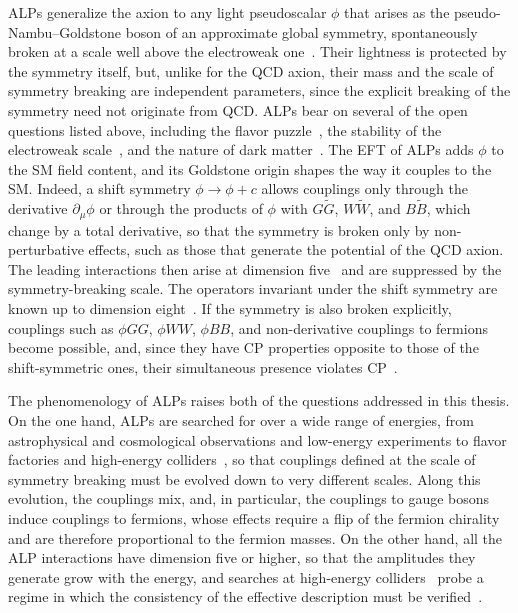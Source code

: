 ALPs generalize the axion to any light pseudoscalar $\phi$ that arises as the
pseudo-Nambu--Goldstone boson of an approximate global symmetry, spontaneously broken at a scale
well above the electroweak one~\cite{Jaeckel:2010ni,Marsh:2015xka,Irastorza:2018dyq,Choi:2020rgn}.
Their lightness is protected by the symmetry itself, but, unlike for the QCD axion, their mass and
the scale of symmetry breaking are independent parameters, since the explicit breaking of the
symmetry need not originate from QCD. ALPs bear on several of the open questions listed above,
including the flavor
puzzle~\cite{Davidson:1981zd,Wilczek:1982rv,Berezhiani:1989fp,Calibbi:2016hwq,Ema:2016ops,Greljo:2024evt},
the stability of the electroweak scale~\cite{Graham:2015cka}, and the nature of dark
matter~\cite{Arias:2012az}. The EFT of ALPs adds $\phi$ to the SM field content, and its
Goldstone origin shapes the way it couples to the SM. Indeed, a shift symmetry
$\phi\to\phi+c$ allows couplings only through the derivative $\partial_\mu\phi$ or through the
products of $\phi$ with $G\widetilde G$, $W\widetilde W$, and $B\widetilde B$, which change by a
total derivative, so that the symmetry is
broken only by non-perturbative effects, such as those that generate the potential of the QCD axion.
The leading interactions then arise at dimension five~\cite{Georgi:1986df} and are suppressed by the
symmetry-breaking scale. The operators invariant under the shift symmetry are known up to dimension
eight~\cite{Song:2023lxf,Grojean:2023tsd,Bertuzzo:2023slg}. If the symmetry is also broken
explicitly, couplings such as $\phi GG$, $\phi WW$, $\phi BB$, and non-derivative couplings to
fermions become possible, and, since they have CP properties opposite to those of the shift-symmetric
ones, their simultaneous presence violates
CP~\cite{Moody:1984ba,Marciano:2016yhf,DiLuzio:2020oah,DiLuzio:2023cuk,DasBakshi:2023lca}.

The phenomenology of ALPs raises both of the questions addressed in this thesis. On the one hand,
ALPs are searched for over a wide range of energies, from astrophysical and cosmological
observations and low-energy experiments to flavor factories and high-energy
colliders~\cite{Irastorza:2018dyq,Bauer:2017ris,Bauer:2021mvw}, so that couplings defined at the
scale of symmetry breaking must be evolved down to very different scales. Along this evolution, the
couplings mix, and, in particular, the couplings to gauge bosons induce couplings to
fermions, whose effects require a flip of the
fermion chirality and are therefore proportional to the fermion masses. On the other hand, all the
ALP interactions have dimension five or higher, so that the amplitudes they generate grow with the
energy, and searches at high-energy
colliders~\cite{Bauer:2017ris,Brivio:2017ije,Gavela:2019cmq} probe a regime in which the consistency
of the effective description must be verified~\cite{Brivio:2021fog}.

